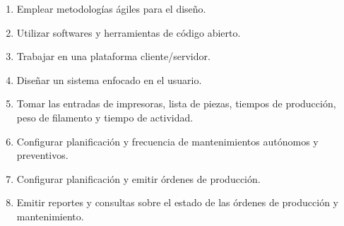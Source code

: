 \begin{enumerate}
	\item Emplear metodologías ágiles para el diseño.
	\item Utilizar softwares y herramientas de código abierto.
	\item Trabajar en una plataforma cliente/servidor.
	\item Diseñar un sistema enfocado en el usuario.
	\item Tomar las entradas de impresoras, lista de piezas, tiempos de producción, peso de filamento y tiempo de actividad. 
	\item Configurar planificación y frecuencia de mantenimientos autónomos y preventivos.
	\item Configurar planificación y emitir órdenes de producción.
	\item Emitir reportes y consultas sobre el estado de las órdenes de producción y mantenimiento. 


\end{enumerate}  
